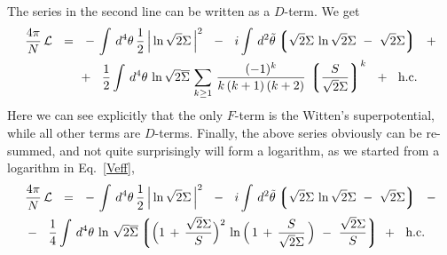 \documentclass[epsfig,12pt]{article}
\newcommand{\cell}{{\mathcal L}}
\newcommand{\ov}{\overline}
\newcommand{\lgr}{\left\lgroup}
\newcommand{\rgr}{\right\rgroup}
\begin{document}
	The series in the second line can be written as a $ D $-term.
	We get
\begin{align}
%
\notag
	\frac{4\pi}{N}\, \cell &    ~~=~~     
			-\,
			\int\, d^4\theta\, \frac{1}{2}\, \Big| \ln \sqrt{2}\Sigma \, \Big|^2
			~~-~~
			i \int\, d^2\tilde\theta 
			\lgr
			\sqrt{2}\Sigma\, \ln \sqrt{2}\Sigma  ~-~ \sqrt{2}\Sigma
			\rgr
			~~+
	\\
%
	&
			\phantom{~~=~~}
			+~~ 
			\frac{1}{2} \int\, d^4\theta\,
			\ln \sqrt{2}\ov\Sigma\,
			\sum_{k \geq 1}\, \frac{    (-1)^k    }
                                           {  k\,(k + 1)\,(k + 2)  }\, \lgr \frac{S}{\sqrt{2}\Sigma} \rgr^k
	~~+~~ \text{h.c.}
\end{align}
	Here we can see explicitly that the only $ F $-term is the Witten's superpotential,
	while all other terms are $ D $-terms.
	Finally, the above series obviously can be re-summed, 
	and not quite surprisingly will form a logarithm,
	as we started from a logarithm in Eq.~\eqref{Veff},
\begin{align}
%
\notag
	&
	\frac{4\pi}{N}\, \cell    ~~=~~     
			-\,
			\int\, d^4\theta\, \frac{1}{2}\, \Big| \ln \sqrt{2}\Sigma \, \Big|^2
			~~-~~
			i \int\, d^2\tilde\theta 
			\lgr
			\sqrt{2}\Sigma\, \ln \sqrt{2}\Sigma  ~-~ \sqrt{2}\Sigma
			\rgr
			~~-
	\\
%
\label{Lsuper}
			&
			-~~ 
			\frac{1}{4} \int\, d^4\theta\,
			\ln\, \sqrt{2}\ov\Sigma
			\lgr \Big( 1 \,+\, \frac{\sqrt{2}\Sigma}{S} \Big)^2\,
				\ln \Big(\, 1 \,+\, \frac{S}{\sqrt{2}\Sigma} \,\Big) ~-~
				\frac{\sqrt{2}\Sigma}{S} \rgr\!\!
			~~+~~ \text{h.c.}
\end{align}
\end{document}
